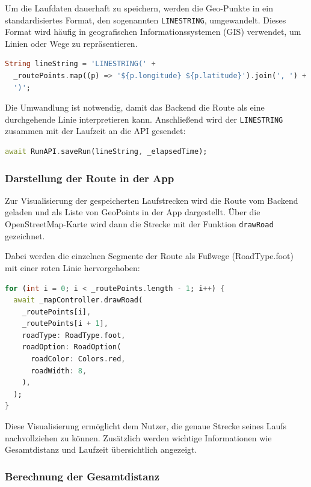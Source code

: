 \documentclass[11pt,a4paper]{article}
\begin{document}
Um die Laufdaten dauerhaft zu speichern, werden die Geo-Punkte in ein standardisiertes Format, den sogenannten \texttt{LINESTRING}, umgewandelt. Dieses Format wird häufig in geografischen Informationssystemen (GIS) verwendet, um Linien oder Wege zu repräsentieren.

\begin{lstlisting}[language=Dart, caption=Erzeugen eines LINESTRINGs]
String lineString = 'LINESTRING(' +
  _routePoints.map((p) => '${p.longitude} ${p.latitude}').join(', ') +
  ')';
\end{lstlisting}

Die Umwandlung ist notwendig, damit das Backend die Route als eine durchgehende Linie interpretieren kann. Anschließend wird der \texttt{LINESTRING} zusammen mit der Laufzeit an die API gesendet:

\begin{lstlisting}[language=Dart, caption=Senden der Laufdaten ans Backend]
await RunAPI.saveRun(lineString, _elapsedTime);
\end{lstlisting}

\subsubsection{Darstellung der Route in der App}

Zur Visualisierung der gespeicherten Laufstrecken wird die Route vom Backend geladen und als Liste von GeoPoints in der App dargestellt. Über die OpenStreetMap-Karte wird dann die Strecke mit der Funktion \texttt{drawRoad} gezeichnet.

Dabei werden die einzelnen Segmente der Route als Fußwege (RoadType.foot) mit einer roten Linie hervorgehoben:

\begin{lstlisting}[language=Dart, caption=Zeichnen der Route auf der Karte]
for (int i = 0; i < _routePoints.length - 1; i++) {
  await _mapController.drawRoad(
    _routePoints[i],
    _routePoints[i + 1],
    roadType: RoadType.foot,
    roadOption: RoadOption(
      roadColor: Colors.red,
      roadWidth: 8,
    ),
  );
}
\end{lstlisting}

Diese Visualisierung ermöglicht dem Nutzer, die genaue Strecke seines Laufs nachvollziehen zu können. Zusätzlich werden wichtige Informationen wie Gesamtdistanz und Laufzeit übersichtlich angezeigt.

\subsubsection{Berechnung der Gesamtdistanz}
\end{document}
